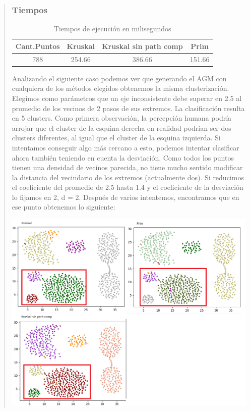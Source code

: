 \documentclass[11pt,a4paper]{article}
\begin{document}
\begin{verse}
\subsubsection{Tiempos}
\begin{table}[ht]
\caption{Tiempos de ejecución en milisegundos} %
\centering %
\begin{tabular}{c c c c} %
\hline\hline %
Cant.Puntos & Kruskal & Kruskal sin path comp & Prim \\ [0.5ex] %
\hline %
788 & 254.66 & 386.66 & 151.66 \\ [1ex] %
\hline %
\end{tabular}
\label{table:nonlin} %
\end{table} 

Analizando el siguiente caso podemos ver que generando el AGM con cualquiera de los métodos elegidos obtenemos la misma clusterización. Elegimos como parámetros que un eje inconsistente debe superar en 2.5 al promedio de los vecinos de 2 pasos de sus extremos. La clasificación resulta en 5 clusters. Como primera observación, la percepción humana podría arrojar que el cluster de la esquina derecha en realidad podrían ser dos clusters diferentes, al igual que el cluster de la esquina izquierda. Si intentamos conseguir algo más cercano a esto, podemos intentar clasificar ahora también teniendo en cuenta la desviación. Como todos los puntos tienen una densidad de vecinos parecida, no tiene mucho sentido modificar la distancia del vecindario de los extremos (actualmente dos). Si reducimos el coeficiente del promedio de 2.5 hasta 1.4 y el coeficiente de la desviación lo fijamos en 2, d = 2. Después de varios intentemos, encontramos que en ese punto obtenemos lo siguiente:


\begin{center}
\includegraphics[scale=.5]{graficos/aggregation2.png}
\end{center}
\end{verse}
\end{document}

